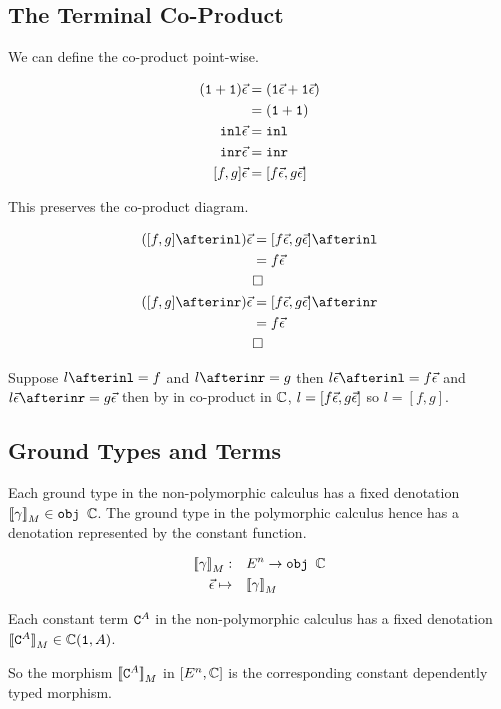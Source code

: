 \documentclass{report}
\begin{document}
\subsection{The Terminal Co-Product}

We can define the co-product point-wise.

\begin{align}
    (\texttt{1} + \texttt{1})\vec{\epsilon} & = (\texttt{1}\vec{\epsilon} + \texttt{1}\vec{\epsilon})\\
    & = (\texttt{1} + \texttt{1})\\
    \texttt{inl}\vec{\epsilon} &= \texttt{inl}\\
    \texttt{inr}\vec{\epsilon} &= \texttt{inr}\\
    [f, g]\vec{\epsilon} &= [f\vec{\epsilon}, g\vec{\epsilon}]\\
\end{align}

This preserves the co-product diagram.

\begin{align}
    ([f, g]\after\inl)\ev & = [f\ev, g\ev]\after \inl\\
    & = f\ev\\
    & \square\\
    ([f, g]\after\inr)\ev& = [f\ev, g\ev]\after \inr\\
    & = f\ev\\
    & \square\\
\end{align}

Suppose $l \after \inl = f$ and $l\after \inr = g$ then $l\ev \after \inl = f\ev$ and $l\ev \after\inr = g\ev$ then by in co-product in $\mathbb{C}$, $l = [f\vec{\epsilon}, g\vec{\epsilon}]$ so $l = [f, g]$.


\subsection{Ground Types and Terms}
Each ground type in the non-polymorphic calculus has a fixed denotation ${\bf [\![}\gamma{\bf ]\!]}_M\in\texttt{obj }\mathbb{C}$. The ground type in the polymorphic calculus hence has a denotation represented by the constant function.

\begin{align}
    {\bf [\![}\gamma{\bf ]\!]}_M:&\quad E^n\rightarrow \texttt{obj }\mathbb{C}\\
    \vec{\epsilon} \mapsto&\quad  {\bf [\![}\gamma{\bf ]\!]}_M\\
\end{align}

Each constant term $\texttt{C}^{A}$ in the non-polymorphic calculus has a fixed denotation ${\bf [\![}\texttt{C}^{A}{\bf ]\!]}_M\in\mathbb{C}(\texttt{1}, A)$.

So the morphism ${\bf [\![}\texttt{C}^{A}{\bf ]\!]}_M$ in $[E^n, \mathbb{C}]$ is the corresponding constant dependently typed morphism.
\end{document}
